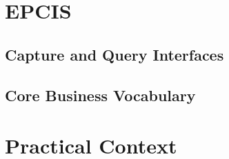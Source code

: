 \section{EPCIS}


\subsection{Capture and Query Interfaces}

\subsection{Core Business Vocabulary}

\section{Practical Context}


\cleardoublepage